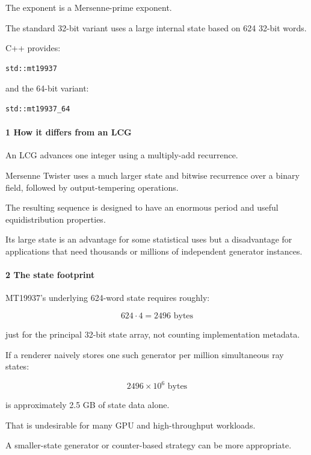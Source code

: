 The exponent is a Mersenne-prime exponent.

The standard 32-bit variant uses a large internal state based on 624 32-bit words.

C++ provides:

\begin{verbatim}
std::mt19937
\end{verbatim}

and the 64-bit variant:

\begin{verbatim}
std::mt19937_64
\end{verbatim}

\paragraph{1 How it differs from an LCG}\label{how-it-differs-from-an-lcg}

An LCG advances one integer using a multiply-add recurrence.

Mersenne Twister uses a much larger state and bitwise recurrence over a binary field, followed by output-tempering operations.

The resulting sequence is designed to have an enormous period and useful equidistribution properties.

Its large state is an advantage for some statistical uses but a disadvantage for applications that need thousands or millions of independent generator instances.

\paragraph{2 The state footprint}\label{the-state-footprint}

MT19937's underlying 624-word state requires roughly:

\[
 624\cdot4=2496\text{ bytes}
\]

just for the principal 32-bit state array, not counting implementation metadata.

If a renderer naively stores one such generator per million simultaneous ray states:

\[
 2496\times10^6\text{ bytes}
\]

is approximately 2.5 GB of state data alone.

That is undesirable for many GPU and high-throughput workloads.

A smaller-state generator or counter-based strategy can be more appropriate.

